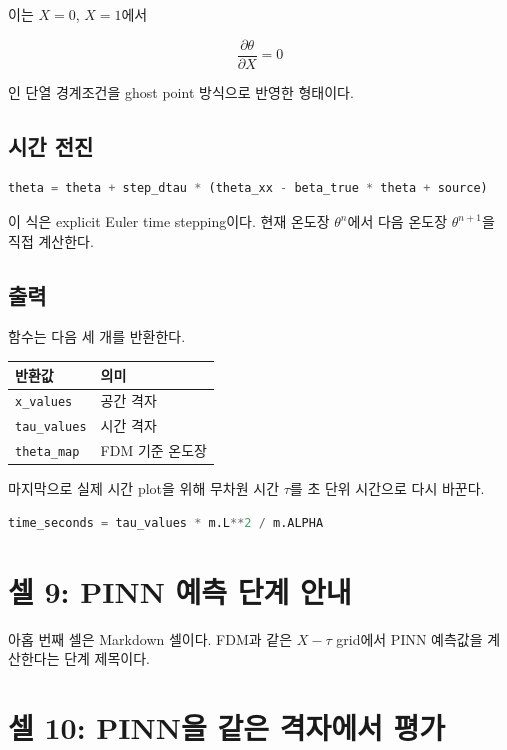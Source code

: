 \documentclass[11pt]{article}
\begin{document}
이는 \(X=0\), \(X=1\)에서

\[
\frac{\partial \theta}{\partial X}=0
\]

인 단열 경계조건을 ghost point 방식으로 반영한 형태이다.

\subsection*{시간 전진}

\begin{lstlisting}[language=Python]
theta = theta + step_dtau * (theta_xx - beta_true * theta + source)
\end{lstlisting}

이 식은 explicit Euler time stepping이다.
현재 온도장 \(\theta^n\)에서 다음 온도장 \(\theta^{n+1}\)을 직접 계산한다.

\subsection*{출력}

함수는 다음 세 개를 반환한다.

\begin{center}
\begin{tabular}{ll}
\toprule
반환값 & 의미 \\
\midrule
\texttt{x\_values} & 공간 격자 \\
\texttt{tau\_values} & 시간 격자 \\
\texttt{theta\_map} & FDM 기준 온도장 \\
\bottomrule
\end{tabular}
\end{center}

마지막으로 실제 시간 plot을 위해 무차원 시간 \(\tau\)를 초 단위 시간으로 다시 바꾼다.

\begin{lstlisting}[language=Python]
time_seconds = tau_values * m.L**2 / m.ALPHA
\end{lstlisting}

\section{셀 9: PINN 예측 단계 안내}

아홉 번째 셀은 Markdown 셀이다.
FDM과 같은 \(X-\tau\) grid에서 PINN 예측값을 계산한다는 단계 제목이다.

\section{셀 10: PINN을 같은 격자에서 평가}
\end{document}
